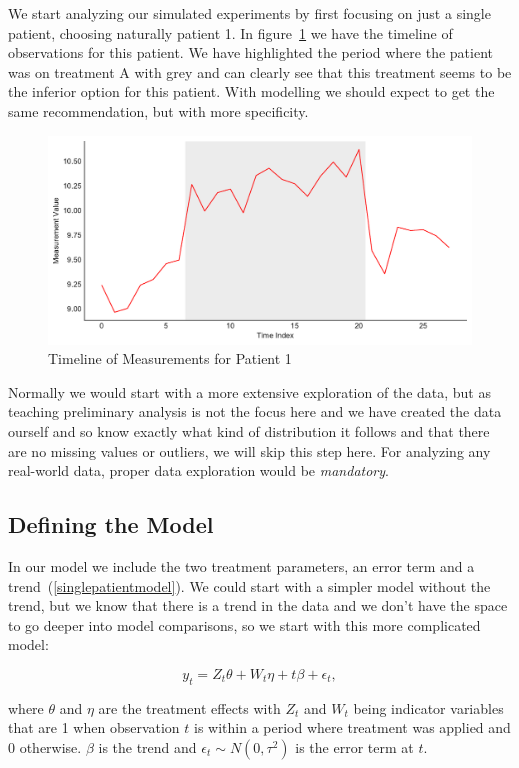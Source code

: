 \documentclass[12pt,a4paper,leqno]{report}
\theoremstyle{plain}
\theoremstyle{definition}
\theoremstyle{remark}
\begin{document}
We start analyzing our simulated experiments by first focusing on just a single patient,
choosing naturally patient 1. In figure\ \ref{patient1timeline} we have the timeline of
observations for this patient. We have highlighted the period where the patient was on treatment A with grey and can
clearly see that this treatment seems to be the inferior option for this patient. With modelling
we should expect to get the same recommendation, but with more specificity.

\begin{figure}[H]
    \caption{Timeline of Measurements for Patient 1}\label{patient1timeline}
    \bigskip
    \includegraphics[width=\textwidth,height=\textheight,keepaspectratio]{patient1_timeline.pdf}
\end{figure}

Normally we would start with a more extensive exploration of the data, but as teaching preliminary analysis
is not the focus here and we have created the data ourself and so know exactly what kind
of distribution it follows and that there are no missing values or outliers, we will
skip this step here. For analyzing any real-world data, proper data exploration would be \emph{mandatory}.

\subsection{Defining the Model}

In our model we include the two treatment parameters, an error term and a trend\ (\ref{singlepatientmodel}). We could
start with a simpler model without the trend, but we know that there is a trend in
the data and we don't have the space to go deeper into model comparisons, so we start
with this more complicated model:

\begin{def}\label{}
    \begin{equation}\label{singlepatientmodel}
        y_t = Z_t\theta + W_t\eta + t\beta + \epsilon_t,
    \end{equation}
\end{def}where \(\theta \) and \(\eta \) are the treatment effects with \(Z_t\) and \(W_t\) being indicator
variables that are 1 when observation \(t\) is within a period where treatment was applied and
0 otherwise. \(\beta \) is the trend and \(\epsilon_{t} \sim N(0,\tau^2) \) is the error term at \(t\).
\end{document}

